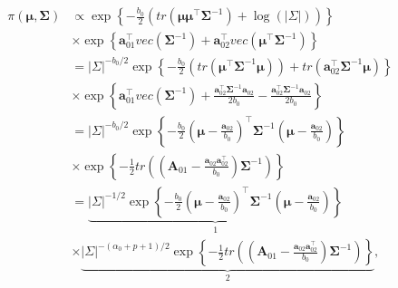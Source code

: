 \begin{enumerate}
\begin{align}
	\pi(\mathbf{\mu},\mathbf{\Sigma})&\propto \exp\left\{-\frac{b_0}{2}\left(tr\left(\mathbf{\mu}\mathbf{\mu}^{\top}\mathbf{\Sigma}^{-1}\right)+\log(|\Sigma|)\right)\right\}\nonumber\\
	&\times \exp\left\{\mathbf{a}_{01}^{\top} vec\left(\mathbf{\Sigma}^{-1}\right)+\mathbf{a}_{02}^{\top}vec\left(\mathbf{\mu}^{\top}\mathbf{\Sigma}^{-1}\right)\right\}\nonumber\\
	&=|\Sigma|^{-b_0/2}\exp\left\{-\frac{b_0}{2}\left(tr\left(\mathbf{\mu}^{\top}\mathbf{\Sigma}^{-1}\mathbf{\mu}\right)\right)+tr\left(\mathbf{a}_{02}^{\top}\mathbf{\Sigma}^{-1}\mathbf{\mu}\right)\right\}\nonumber\\
	&\times \exp\left\{\mathbf{a}_{01}^{\top} vec\left(\mathbf{\Sigma}^{-1}\right)+\frac{\mathbf{a}_{02}^{\top}\mathbf{\Sigma}^{-1}\mathbf{a}_{02}}{2b_0}-\frac{\mathbf{a}_{02}^{\top}\mathbf{\Sigma}^{-1}\mathbf{a}_{02}}{2b_0}\right\}\nonumber\\
	&=|\Sigma|^{-b_0/2}\exp\left\{-\frac{b_0}{2}\left(\mathbf{\mu}-\frac{\mathbf{a}_{02}}{b_0}\right)^{\top}\mathbf{\Sigma}^{-1}\left(\mathbf{\mu}-\frac{\mathbf{a}_{02}}{b_0}\right)\right\}\nonumber\\
	&\times \exp\left\{-\frac{1}{2}tr\left(\left(\mathbf{A}_{01}-\frac{\mathbf{a}_{02}\mathbf{a}_{02}^{\top}}{b_0}\right)\mathbf{\Sigma}^{-1}\right)\right\}\nonumber\\
	&=\underbrace{|\Sigma|^{-1/2}\exp\left\{-\frac{b_0}{2}\left(\mathbf{\mu}-\frac{\mathbf{a}_{02}}{b_0}\right)^{\top}\mathbf{\Sigma}^{-1}\left(\mathbf{\mu}-\frac{\mathbf{a}_{02}}{b_0}\right)\right\}}_1\nonumber\\
	&\times \underbrace{|\Sigma|^{-(\alpha_0+p+1)/2}\exp\left\{-\frac{1}{2}tr\left(\left(\mathbf{A}_{01}-\frac{\mathbf{a}_{02}\mathbf{a}_{02}^{\top}}{b_0}\right)\mathbf{\Sigma}^{-1}\right)\right\}}_2,\nonumber
\end{align}


\end{enumerate}
